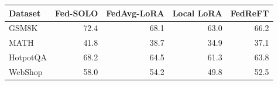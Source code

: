 \begin{tabular}{lrrrr}
\toprule
Dataset & Fed-SOLO & FedAvg-LoRA & Local LoRA & FedReFT \\
\midrule
GSM8K & 72.4 & 68.1 & 63.0 & 66.2 \\
MATH & 41.8 & 38.7 & 34.9 & 37.1 \\
HotpotQA & 68.2 & 64.5 & 61.3 & 63.8 \\
WebShop & 58.0 & 54.2 & 49.8 & 52.5 \\
\bottomrule
\end{tabular}
